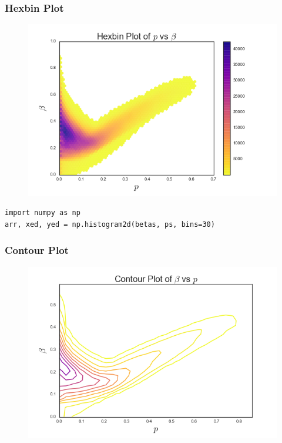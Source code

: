 \documentclass{beamer}
\begin{document}
\begin{frame}
\frametitle{Hexbin Plot}
\begin{figure}
	\includegraphics[width=\textwidth]{hexbin}
\end{figure}
\end{frame}

\begin{frame}[fragile]
\begin{verbatim}
import numpy as np
arr, xed, yed = np.histogram2d(betas, ps, bins=30)
\end{verbatim}
\end{frame}

\begin{frame}
\frametitle{Contour Plot}
\begin{figure}
	\includegraphics[width=\textwidth]{contour}
\end{figure}
\end{frame}
\end{document}
